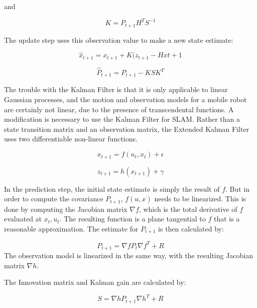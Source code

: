 \documentclass[12pt]{report}
\begin{document}
and

\begin{equation}\label{kf_gain}
K = P_{t+1}H^TS^{-1}
\end{equation}

The update step uses this observation value to make a new state estimate:

\begin{equation}\label{kf_update}
\hat{x}_{t+1} = x_{t+1} + K(z_{t+1} - Hx{t+1}
\end{equation}

\begin{equation}\label{kf_update_cov}
\hat{P}_{t+1} = P_{t+1} - KSK^T
\end{equation}


The trouble with the Kalman Filter is that it is only applicable to linear Gaussian processes, and the motion and observation models for a mobile robot are certainly not linear, due to the presence of transcendental functions.  A modification is necessary to use the Kalman Filter for SLAM.  Rather than a state transition matrix and an observation matrix, the Extended Kalman Filter uses two differentiable non-linear functions.

\begin{equation}\label{ekf_f}
x_{t+1} = f(u_t, x_t) + \epsilon
\end{equation}

\begin{equation}\label{ekf_h}
z_{t+1} = h(x_{t+1}) + \gamma
\end{equation}

In the prediction step, the initial state estimate is simply the result of $f$.  But in order to compute the covariance $P_{t+1}$, $f(u,x)$ needs to be linearized.  This is done by computing the Jacobian matrix $\nabla f$, which is the total derivative of $f$ evaluated at $x_t, u_t$.  The resulting function is a plane tangential to $f$ that is a reasonable approximation.  The estimate for $P_{t+1}$ is then calculated by:

\begin{equation}\label{ekf_cov}
P_{t+1} = \nabla fP_t \nabla f^T + R
\end{equation}
The observation model is linearized in the same way, with the resulting Jacobian matrix $\nabla h$.

The Innovation matrix and Kalman gain are calculated by:

\begin{equation}\label{ekf_S}
S = \nabla h P_{t+1} \nabla h^T + R
\end{equation}
\end{document}
